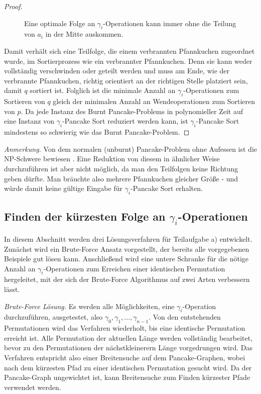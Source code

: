 \documentclass[a4paper, 10pt, ngerman]{article}
\begin{document}
\begin{proof}
    \begin{figure}[H]
        \centering
        
        \caption{Eine optimale Folge an $\gamma_i$-Operationen kann immer ohne die Teilung von $a_i$ in der Mitte auskommen.}
    \end{figure}

    Damit verhält sich eine Teilfolge, die einem verbrannten Pfannkuchen zugeordnet wurde, im Sortierprozess wie ein verbrannter Pfannkuchen. Denn sie kann weder vollständig verschwinden oder geteilt werden und muss am Ende, wie der verbrannte Pfannkuchen, richtig orientiert an der richtigen Stelle platziert sein, damit $q$ sortiert ist. Folglich ist die minimale Anzahl an $\gamma_i$-Operationen zum Sortieren von $q$ gleich der minimalen Anzahl an Wendeoperationen zum Sortieren von $p$. Da jede Instanz des Burnt Pancake-Problems in polynomieller Zeit auf eine Instanz von $\gamma_i$-Pancake Sort reduziert werden kann, ist $\gamma_i$-Pancake Sort mindestens so schwierig wie das Burnt Pancake-Problem.
\end{proof}

\emph{Anmerkung.} Von dem normalen (unburnt) Pancake-Problem ohne Aufessen ist die NP-Schwere bewiesen \cite{nphard}. Eine Reduktion von diesem in ähnlicher Weise durchzuführen ist aber nicht möglich, da man den Teilfolgen keine Richtung geben dürfte. Man bräuchte also mehrere Pfannkuchen gleicher Größe - und würde damit keine gültige Eingabe für $\gamma_i$-Pancake Sort erhalten.

\subsection{Finden der kürzesten Folge an $\gamma_i$-Operationen}

In diesem Abschnitt werden drei Lösungsverfahren für Teilaufgabe a) entwickelt. Zunächst wird ein Brute-Force Ansatz vorgestellt, der bereits alle vorgegebenen Beispiele gut lösen kann. Anschließend wird eine untere Schranke für die nötige Anzahl an $\gamma_i$-Operationen zum Erreichen einer identischen Permutation hergeleitet, mit der sich der Brute-Force Algorithmus auf zwei Arten verbessern lässt.
\medskip

\emph{{Brute-Force Lösung.}} Es werden alle Möglichkeiten, eine $\gamma_i$-Operation durchzuführen, ausgetestet, also $\gamma_0, \gamma_1, \dots, \gamma_{n-1}$. Von den entstehenden Permutationen wird das Verfahren wiederholt, bis eine identische Permutation erreicht ist. Alle Permutation der aktuellen Länge werden vollständig bearbeitet, bevor zu den Permutationen der nächstkleinerern Länge vorgedrungen wird. Das Verfahren entspricht also einer Breitensuche auf dem Pancake-Graphen, wobei nach dem kürzesten Pfad zu einer identischen Permutation gesucht wird. Da der Pancake-Graph ungewichtet ist, kann Breitensuche zum Finden kürzester Pfade verwendet werden.
\end{document}
